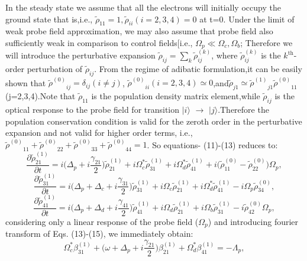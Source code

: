 \documentclass[12pt,a4paper]{article}
\begin{document}
In the steady state we assume that all the electrons will initially occupy the ground state that is,i.e., $\tilde\rho_{11} = 1, \tilde\rho_{ii}{(i=2,3,4)}=0$ at t=0. Under the limit of weak probe field approximation, we may also assume that probe field also sufficiently weak in comparison to control fields[i.e., $\Omega_p \ll \Omega_c,\Omega_b$; Therefore we will introduce the perturbative expansion $\tilde\rho_{ij} = \sum\limits_{k} \tilde\rho^{(k)}_{ij}$, where $\tilde\rho^{(k)}_{ij}$ is the \(k^{\text{th}}\)-order perturbation of ${\tilde\rho}_{ij}$. From the regime of adibatic formulation,it can be easily shown that ${{\tilde\rho}^{(0)}}_{ij}=\delta_{ij}(i\neq j)$, ${{\tilde\rho}^{(0)}}_{ii}(i=2,3,4)\simeq0$,and$\tilde\rho_{j1}\simeq{{\tilde\rho}^{(1)}}_{j1}{{\tilde\rho}^{(0)}}_{11}$ (j=2,3,4).Note that $\tilde\rho_{11}$ is the population density matrix element,while $\tilde\rho_{ij}$ is the optical response to the probe field for transition $|i\rangle$ $\rightarrow$ $|j\rangle$.Therefore the population conservation condition is valid for the zeroth order in the perturbative expansion and not valid for higher order terms, i.e., \({{\tilde\rho}^{(0)}}_{11}+{{\tilde\rho}^{(0)}}_{22}+{{\tilde\rho}^{(0)}}_{33}+{{\tilde\rho}^{(0)}}_{44}=1\). So equations- (11)-(13) reduces to:
\begin{equation}
    \frac{\partial\tilde\rho_{21}^{(1)}}{\partial t} = i\big(\Delta_p+i\frac{\gamma_{21}}{2}\big)\tilde{\rho}_{21}^{(1)}+i\Omega_c^*\tilde{\rho}_{31}^{(1)}+i\Omega_d^*\tilde{\rho}_{41}^{(1)}+i\big(\tilde{\rho}_{11}^{(0)}-\tilde{\rho}_{22}^{(0)}\big)\Omega_p,
\end{equation}
\begin{equation}
    \frac{\partial\tilde{\rho}_{31}^{(1)}}{\partial t}=i\big(\Delta_p+\Delta_c+i\frac{\gamma_{31}}{2}\big)\tilde{\rho}_{31}^{(1)}+i\Omega_c\tilde{\rho}_{21}^{(1)}+i\Omega_d^*\tilde{\rho}_{41}^{(1)}-i\Omega_p\tilde{\rho}_{34}^{(0)},
\end{equation}
\begin{equation}
    \frac{\partial\tilde{\rho}_{41}^{(1)}}{\partial t}=i\big(\Delta_p+\Delta_d+i\frac{\gamma_{41}}{2}\big)\tilde{\rho}_{41}^{(1)}+i\Omega_d\tilde{\rho}_{21}^{(1)}+i\Omega_b\tilde{\rho}_{31}^{(1)}-i\tilde{\rho}_{42}^{(0)}\Omega_p,
\end{equation}
considering only a linear response of the probe field ($\Omega_p$) and introducing fourier transform of Eqs. (13)-(15), we immediately obtain:
\begin{equation}
    \Omega_c^*\beta_{31}^{(1)}+\big(\omega+\Delta_p+i\frac{\gamma_{21}}{2}\big)\beta_{21}^{(1)}+\Omega_d^*\beta_{41}^{(1)}=-\Lambda_p,
\end{equation}
\end{document}

